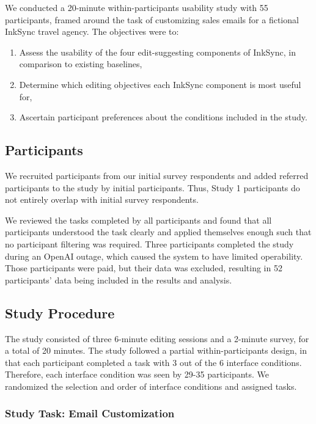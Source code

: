\documentclass[manuscript]{acmart}
\begin{document}
We conducted a 20-minute within-participants usability study with 55 participants, framed around the task of customizing sales emails for a fictional InkSync travel agency. The objectives were to:
\begin{enumerate}
    \item Assess the usability of the four edit-suggesting components of InkSync, in comparison to existing baselines,
    \item Determine which editing objectives each InkSync component is most useful for,
    \item Ascertain participant preferences about the conditions included in the study.
\end{enumerate}

\subsection{Participants} \label{sec:study1_participants}

We recruited participants from our initial survey respondents and added referred participants to the study by initial participants. Thus, Study 1 participants do not entirely overlap with initial survey respondents.

We reviewed the tasks completed by all participants and found that all participants understood the task clearly and applied themselves enough such that no participant filtering was required. Three participants completed the study during an OpenAI outage, which caused the system to have limited operability. Those participants were paid, but their data was excluded, resulting in 52 participants' data being included in the results and analysis.

\subsection{Study Procedure} \label{sec:study1_procedure}

The study consisted of three 6-minute editing sessions and a 2-minute survey, for a total of 20 minutes. The study followed a partial within-participants design, in that each participant completed a task with 3 out of the 6 interface conditions. Therefore, each interface condition was seen by 29-35 participants. We randomized the selection and order of interface conditions and assigned tasks.

\subsubsection{Study Task: Email Customization}
\end{document}
